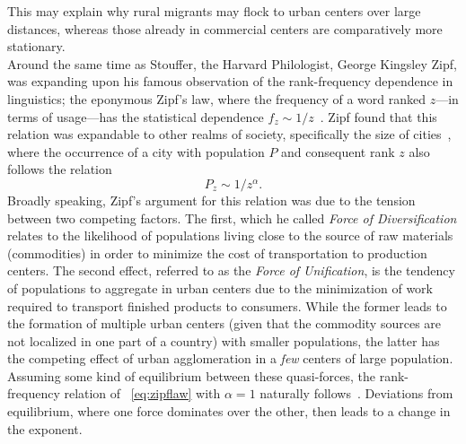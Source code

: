 This may explain why rural migrants may flock to urban centers over large distances, whereas those already in commercial centers are comparatively more stationary.\\

 Around the same time as Stouffer, the Harvard Philologist, George Kingsley Zipf, was expanding upon his famous observation of the rank-frequency dependence in linguistics; the eponymous Zipf's law, where the frequency of a word ranked $z$---in terms of usage---has the statistical dependence $f_z \sim 1/z$~\cite{zipf_1936_psychobiology}. Zipf found that this relation was expandable to other realms of society, specifically the size of cities~\cite{zipf_1940_generalized}, where the occurrence of a city with population $P$ and consequent rank $z$ also follows the relation 
%
\begin{equation}
P_z \sim 1/z^{\alpha}.
\label{eq:zipflaw}
\end{equation}
%
Broadly speaking, Zipf's argument for this relation was due to the tension between two competing factors. The first, which he called \emph{Force of Diversification} relates to the likelihood of populations living close to the source of raw materials (commodities) in order to minimize the cost of transportation to production centers. The second effect, referred to as the \emph{Force of Unification}, is the tendency of populations to aggregate in urban centers due to the minimization of work required to transport finished products to consumers. While the former leads to the formation of multiple urban centers (given that the commodity sources are not localized in one part of a country) with smaller populations, the latter has the competing effect of urban agglomeration in a \emph{few} centers of large population. Assuming some kind of equilibrium between these quasi-forces, the rank-frequency relation of \equationname~\eqref{eq:zipflaw} with $\alpha = 1$ naturally follows~\cite{zipf_1941_national}. Deviations from equilibrium, where one force dominates over the other, then leads to a change in the exponent.  

